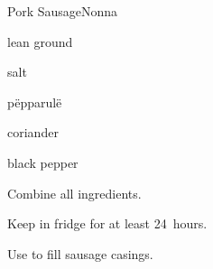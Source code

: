 \begin{recipe}{Pork Sausage}{Nonna}{}

\begin{ingredients}
\item lean ground 
\item salt
\item p\"epparul\"e
\item coriander
\item black pepper
\end{ingredients}

\begin{directions}
\item Combine all ingredients.
\item Keep in fridge for at least 24~hours.
\item Use to fill sausage casings.
\end{directions}

\end{recipe}
